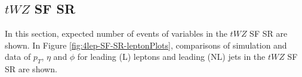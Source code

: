 \subsection{$tWZ$ SF SR}
\label{sec:controlplotstetralepton-tWZ-SF-SR}


In this section, expected number of events of variables in the $tWZ$ SF SR are shown. In Figure \ref{fig:4lep-SF-SR-leptonPlots}, comparisons of simulation and data of $p_{T}$, $\eta$ and $\phi$ for leading (L) leptons and leading (NL) jets in the $tWZ$ SF SR are shown.
\begin{figure}[htbp]
\centering
  \begin{tabular}{ccc}



\end{tabular}
\end{figure}
